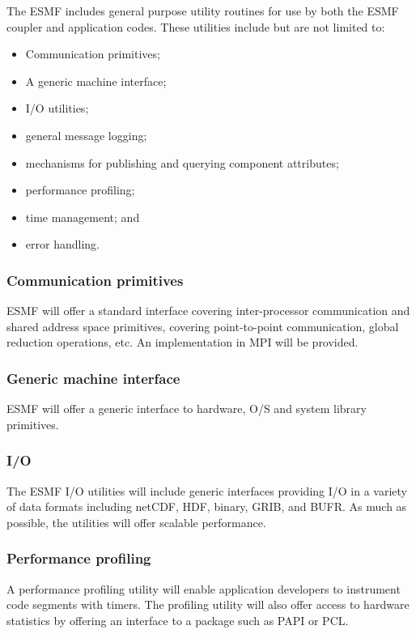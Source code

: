The ESMF includes general purpose utility routines for use by both 
the ESMF coupler and application codes.  These utilities include 
but are not limited to:
\begin{itemize}
\item Communication primitives;
\item A generic machine interface;
\item I/O utilities;
\item general message logging;
\item mechanisms for publishing and querying component attributes;
\item performance profiling;
\item time management; and
\item error handling.
\end{itemize}

\subsubsection{Communication primitives}

ESMF will offer a standard interface covering inter-processor
communication and shared address space primitives, covering
point-to-point communication, global reduction operations, etc. An
implementation in MPI will be provided.

\subsubsection{Generic machine interface}

ESMF will offer a generic interface to hardware, O/S and system
library primitives.

\subsubsection{I/O}

The ESMF I/O utilities will include generic interfaces providing I/O
in a variety of data formats including netCDF, HDF, binary, GRIB, and
BUFR. As much as possible, the utilities will offer scalable
performance.

\subsubsection{Performance profiling}

A performance profiling utility will enable application developers to 
instrument code segments with timers. The profiling utility will also
offer access to hardware statistics by offering an interface to a
package such as PAPI or PCL.

